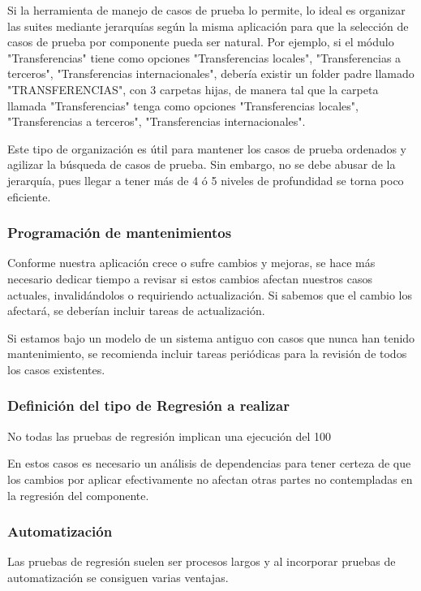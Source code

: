 \documentclass[twocolumn]{article}
\begin{document}
Si la herramienta de manejo de casos de prueba lo permite, lo ideal es organizar las suites mediante jerarquías según la misma aplicación para que la selección de casos de prueba por componente pueda ser natural. Por ejemplo, si el módulo "Transferencias" tiene como opciones "Transferencias locales", "Transferencias a terceros", "Transferencias internacionales", debería existir un folder padre llamado "TRANSFERENCIAS", con 3 carpetas hijas, de manera tal que la carpeta llamada "Transferencias" tenga como opciones "Transferencias locales", "Transferencias a terceros", "Transferencias internacionales".

Este tipo de organización es útil para mantener los casos de prueba ordenados y agilizar la búsqueda de casos de prueba. Sin embargo, no se debe abusar de la jerarquía, pues llegar a tener más de 4 ó 5 niveles de profundidad se torna poco eficiente.  

\subsubsection{  Programación de mantenimientos}
Conforme nuestra aplicación crece o sufre cambios y mejoras, se hace más necesario dedicar tiempo a revisar si estos cambios afectan nuestros casos actuales, invalidándolos o requiriendo actualización. Si sabemos que el cambio los afectará, se deberían incluir tareas de actualización.


Si estamos bajo un modelo de un sistema antiguo con casos que nunca han tenido mantenimiento, se recomienda incluir tareas periódicas para la revisión de todos los casos existentes.

\subsubsection{  Definición del tipo de Regresión a realizar}
No todas las pruebas de regresión implican una ejecución del 100%


En estos casos es necesario un análisis de dependencias para tener certeza de que los cambios por aplicar efectivamente no afectan otras partes no contempladas en la regresión del componente.

\subsubsection{ Automatización}
Las pruebas de regresión suelen ser procesos largos y al incorporar pruebas de automatización se consiguen varias ventajas.
\end{document}
